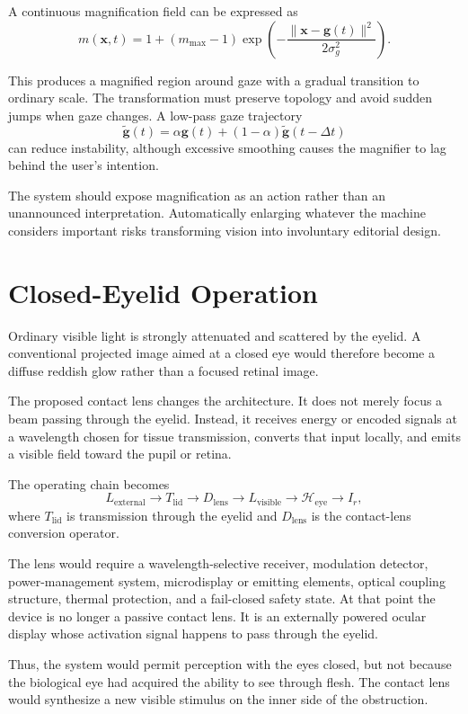 \documentclass[11pt]{article}
\begin{document}
A continuous magnification field can be expressed as
\[
m(\mathbf{x},t)=1+(m_{\max}-1)\exp\left(-\frac{\|\mathbf{x}-\mathbf{g}(t)\|^2}{2\sigma_g^2}\right).
\]

This produces a magnified region around gaze with a gradual transition to ordinary scale. The transformation must preserve topology and avoid sudden jumps when gaze changes. A low-pass gaze trajectory
\[
\widetilde{\mathbf{g}}(t)=\alpha\mathbf{g}(t)+(1-\alpha)\widetilde{\mathbf{g}}(t-\Delta t)
\]
can reduce instability, although excessive smoothing causes the magnifier to lag behind the user's intention.

The system should expose magnification as an action rather than an unannounced interpretation. Automatically enlarging whatever the machine considers important risks transforming vision into involuntary editorial design.

\section{Closed-Eyelid Operation}

Ordinary visible light is strongly attenuated and scattered by the eyelid. A conventional projected image aimed at a closed eye would therefore become a diffuse reddish glow rather than a focused retinal image.

The proposed contact lens changes the architecture. It does not merely focus a beam passing through the eyelid. Instead, it receives energy or encoded signals at a wavelength chosen for tissue transmission, converts that input locally, and emits a visible field toward the pupil or retina.

The operating chain becomes
\[
L_{\mathrm{external}}\rightarrow T_{\mathrm{lid}}\rightarrow D_{\mathrm{lens}}\rightarrow L_{\mathrm{visible}}\rightarrow\mathcal{H}_{\mathrm{eye}}\rightarrow I_r,
\]
where $T_{\mathrm{lid}}$ is transmission through the eyelid and $D_{\mathrm{lens}}$ is the contact-lens conversion operator.

The lens would require a wavelength-selective receiver, modulation detector, power-management system, microdisplay or emitting elements, optical coupling structure, thermal protection, and a fail-closed safety state. At that point the device is no longer a passive contact lens. It is an externally powered ocular display whose activation signal happens to pass through the eyelid.

Thus, the system would permit perception with the eyes closed, but not because the biological eye had acquired the ability to see through flesh. The contact lens would synthesize a new visible stimulus on the inner side of the obstruction.
\end{document}

